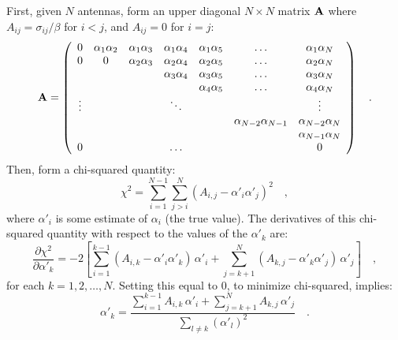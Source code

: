 \documentclass[11pt]{article}
\begin{document}
First, given $N$ antennas, form an upper diagonal $N \times N$ matrix
${\bf A}$ where $A_{ij} = \sigma_{ij} / \beta$ for $i < j$, and
$A_{ij} = 0$ for $i = j$:
\begin{equation}
  \label{Aeqn}
   {\bf A} = \left(
             \begin{array}{ccccccc}
             0 & \alpha_1\alpha_2 & \alpha_1\alpha_3 & \alpha_1\alpha_4
                  & \alpha_1\alpha_5& \ldots & \alpha_1\alpha_N \\
             0 & 0 & \alpha_2\alpha_3 & \alpha_2\alpha_4
                  & \alpha_2\alpha_5 & \ldots & \alpha_2\alpha_N \\
               & & & \alpha_3\alpha_4
                  & \alpha_3\alpha_5 & \ldots & \alpha_3\alpha_N \\
               & & &
                  & \alpha_4\alpha_5 & \ldots & \alpha_4\alpha_N \\
             \vdots & & & \ddots & & & \vdots \\
              & & &
                  & & \alpha_{N-2}\alpha_{N-1} & \alpha_{N-2}\alpha_N \\
              & & & & & & \alpha_{N-1}\alpha_N \\
             0 & & & \ldots & & & 0
             \end{array}
             \right)
  \quad .
\end{equation}
Then, form a chi-squared quantity:
\begin{equation}
   \chi^2 = \sum_{i=1}^{N-1} \sum_{j>i}^N
              \left(A_{i,j} - \alpha'_i\alpha'_j\right)^2
   \quad ,
   \label{chisqeqn}
\end{equation}
where $\alpha'_i$ is some estimate of $\alpha_i$ (the true value).
The derivatives of this chi-squared quantity with respect to the
values of the $\alpha'_k$ are:
\begin{equation}
\frac{\partial\chi^2}{\partial\alpha'_k} =
   -2\left[\sum_{i=1}^{k-1} \left(A_{i,k} -
                                  \alpha'_i\alpha'_k\right) \, \alpha'_i
         + \sum_{j=k+1}^N \left(A_{k,j} -
                                \alpha'_k\alpha'_j\right) \, \alpha'_j
     \right]
\quad ,
\end{equation}
for each $k=1,2,\ldots,N$.  Setting this equal to 0, to minimize
chi-squared, implies:
\begin{equation}
   \alpha'_k = \dfrac{
      \displaystyle \sum_{i=1}^{k-1} A_{i,k}\,\alpha'_i +
                      \sum_{j=k+1}^N A_{k,j}\,\alpha'_j}
     {\displaystyle \sum_{l \neq k} \left(\alpha'_l\right)^2}
  \quad .
  \label{alphaeqn}
\end{equation}
\end{document}
